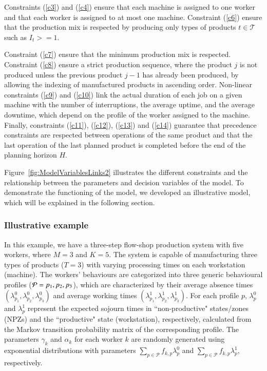\documentclass[review,12pt, 3p, times]{elsarticle}
\begin{document}
Constraints (\ref{c3}) and (\ref{c4}) ensure that each machine is assigned to one worker and that each worker is assigned to at most one machine. 
Constraint (\ref{c6}) ensure that the production mix is respected by producing only types of products $t\in\mathcal{T}$ such as $I_t >= 1$.

Constraint (\ref{c7}) ensure that the minimum production mix is respected.
Constraint (\ref{c8}) ensure a strict production sequence, where the product $j$ is not produced unless the previous product $j-1$ has already been produced, by allowing the indexing of manufactured products in ascending order.
Non-linear constraints (\ref{c9}) and (\ref{c10}) link the actual duration of each job on a given machine with the number of interruptions, the average uptime, and the average downtime, which depend on the profile of the worker assigned to the machine.  
Finally, constraints (\ref{c11}), (\ref{c12}), (\ref{c13}) and (\ref{c14}) guarantee that precedence constraints are respected between operations of the same product and that the last operation of the last planned product is completed before the end of the planning horizon $H$.
	
Figure~\ref{fig:ModelVariablesLinks2} illustrates the different constraints and the relationship between the parameters and decision variables of the model. To demonstrate the functioning of the model, we developed an illustrative model, which will be explained in the following section.
	
\subsubsection{Illustrative example}
In this example, we have a three-step flow-shop production system with five workers, where $M=3$ and $K=5$. The system is capable of manufacturing three types of products ($T=3$) with varying processing times on each workstation (machine). The workers' behaviours are categorized into three generic behavioural profiles (${\cal P}={p_1,p_2,p_3}$), which are characterized by their average absence times $(\lambda^0_{p_1},\lambda^0_{p_2},\lambda^0_{p_3})$ and average working times $(\lambda^1_{p_1},\lambda^1_{p_2},\lambda^1_{p_3})$. For each profile $p$, $\lambda^0_{p}$ and $\lambda^1_{p}$ represent the expected sojourn times in “non-productive" states/zones (NPZs) and the “productive" state (workstation), respectively, calculated from the Markov transition probability matrix of the corresponding profile. The parameters $\gamma_k$ and $\alpha_k$ for each worker $k$ are randomly generated using exponential distributions with parameters $\sum_{p\in\mathcal{P}}f_{k,p}\lambda^0_p$ and $\sum_{p\in\mathcal{P}}f_{k,p}\lambda^1_p$, respectively.  
					
\end{document}
